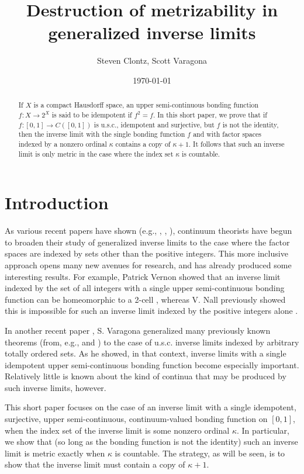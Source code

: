 \documentclass{amsart}
\title{Destruction of metrizability in generalized inverse limits}
\author{Steven Clontz, Scott Varagona}
\date{\today}
\theoremstyle{definition}
\newcommand{\<}{\langle}
\renewcommand{\>}{\rangle}
\begin{document}
\begin{abstract}
If $X$ is a compact Hausdorff space, an upper semi-continuous bonding function $f: X \rightarrow 2^{X}$ is said to be idempotent if $f^2 = f$. In this short paper, we prove that if $f: [0,1] \rightarrow C([0,1])$ is u.s.c., idempotent and surjective, but $f$ is not the identity, then the inverse limit with the single bonding function $f$ and with factor spaces indexed by a nonzero ordinal $\kappa$ contains a copy of $\kappa + 1$. It follows that such an inverse limit is only metric in the case where the index set $\kappa$ is countable.
\end{abstract}

\maketitle

\section{Introduction}

As various recent papers have shown (e.g., \cite{char roe}, \cite{varagona}, \cite{vernon}), continuum theorists have begun to broaden their study of generalized inverse limits to the case where the factor spaces are indexed by sets other than the positive integers. This more inclusive approach opens many new avenues for research, and has already produced some interesting results. For example, Patrick Vernon showed that an inverse limit indexed by the set of all integers with a single upper semi-continuous bonding function can be homeomorphic to a 2-cell \cite{vernon}, whereas V. Nall previously showed this is impossible for such an inverse limit indexed by the positive integers alone \cite{nall 2cell}.

In another recent paper \cite{varagona}, S. Varagona generalized many previously known theorems (from, e.g., \cite{ingram mahavier} and \cite{nall connected}) to the case of u.s.c. inverse limits indexed by arbitrary totally ordered sets. As he showed, in that context, inverse limits with a single idempotent upper semi-continuous bonding function become especially important. Relatively little is known about the kind of continua that may be produced by such inverse limits, however.

This short paper focuses on the case of an inverse limit with a single idempotent, surjective, upper semi-continuous, continuum-valued bonding function on $[0,1]$, when the index set of the inverse limit is some nonzero ordinal $\kappa$. In particular, we show that (so long as the bonding function is not the identity) such an inverse limit is metric exactly when $\kappa$ is countable. The strategy, as will be seen, is to show that the inverse limit must contain a copy of $\kappa + 1$.
\end{document}
